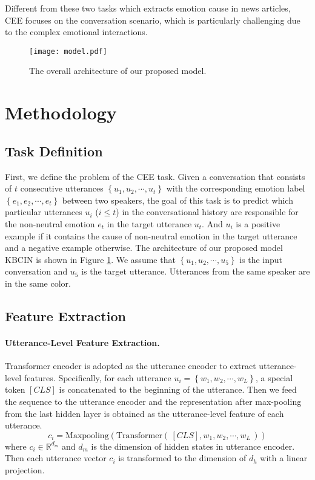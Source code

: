 \documentclass[letterpaper]{article} \usepackage{aaai23}  \usepackage{times}  \usepackage{helvet}  \usepackage{courier}  \usepackage[hyphens]{url}  \usepackage{graphicx} \urlstyle{rm} \def\UrlFont{\rm}  \usepackage{natbib}  \usepackage{caption} \frenchspacing  \setlength{\pdfpagewidth}{8.5in} \setlength{\pdfpageheight}{11in} \usepackage{algorithm}
\begin{document}
Different from these two tasks which extracts emotion cause in news articles, CEE focuses on the conversation scenario, which is particularly challenging due to the complex emotional interactions.

\begin{figure*}[htbp]
\centering
\texttt{[image: model.pdf]}
\caption{The overall architecture of our proposed model.}
\label{model}
\end{figure*}

\section{Methodology}
\subsection{Task Definition}
First, we define the problem of the CEE task. Given a conversation that consists of $t$ consecutive utterances $\left\{u_1, u_2, \cdots, u_t \right\}$ with the corresponding emotion label $\left\{e_1, e_2, \cdots, e_t \right\}$ between two speakers, the goal of this task is to predict which particular utterances $u_i$ ($i \le t$) in the conversational history are responsible for the non-neutral emotion $e_t$ in the target utterance $u_t$. And $u_i$ is a positive example if it contains the cause of non-neutral emotion in the target utterance and a negative example otherwise. The architecture of our proposed model KBCIN is shown in Figure \ref{model}. We assume that $\left\{u_1, u_2, \cdots, u_5 \right\}$ is the input conversation and $u_5$ is the target utterance. Utterances from the same speaker are in the same color.

\subsection{Feature Extraction}
\paragraph{Utterance-Level Feature Extraction.}
Transformer encoder \citep{trans} is adopted as the utterance encoder to extract utterance-level features. Specifically, for each utterance $u_i = \left\{w_1, w_2, \cdots, w_L \right\}$, a special token $[CLS]$ is concatenated to the beginning of the utterance. Then we feed the sequence to the utterance encoder and the representation after max-pooling from the last hidden layer is obtained as the utterance-level feature of each utterance.
\begin{equation}
    c_i = \textrm{Maxpooling}(\textrm{Transformer}(\,[CLS], w_1, w_2, \cdots, w_L\,))
\end{equation}
where $c_i \in \mathbb{R}^{d_m}$ and $d_m$ is the dimension of hidden states in utterance encoder. Then each utterance vector $c_i$ is transformed to the dimension of $d_h$ with a linear projection.
\end{document}
